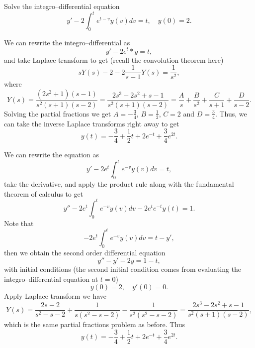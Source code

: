 \documentclass[11pt]{article}
\begin{document}
\begin{problem}
Solve the integro--differential equation
\[y'-2\int_{0}^{t}e^{t-v}y(v)dv=t,\quad y(0)=2.\]
\end{problem}
\begin{solution}
We can rewrite the integro--differential as
\[y'-2e^{t}*y=t,\]
and take Laplace transform to get (recall the convolution theorem here)
\[sY(s)-2-2\frac{1}{s-1}Y(s)=\frac{1}{s^{2}},\]
where
\[Y(s)=\frac{(2s^{2}+1)(s-1)}{s^{2}(s+1)(s-2)}=\frac{2s^{3}-2s^{2}+s-1}{s^{2}(s+1)(s-2)}=\frac{A}{s}+\frac{B}{s^{2}}+\frac{C}{s+1}+\frac{D}{s-2}.\]
Solving the partial fractions we get $A=-\frac{3}{4}$, $B=\frac{1}{2}$, $C=2$ and $D=\frac{3}{4}$.
Thus, we can take the inverse Laplace transforms right away to get
\[\boxed{y(t)=-\frac{3}{4}+\frac{1}{2}t+2e^{-t}+\frac{3}{4}e^{2t}}.\]
\end{solution}
\begin{solution}
We can rewrite the equation as
\[y'-2e^{t}\int_{0}^{t}e^{-v}y(v)dv=t,\]
take the derivative, and apply the product rule along with the fundamental theorem of calculus to get
\[y''-2e^{t}\int_{0}^{t}e^{-v}y(v)dv-2e^{t}e^{-t}y(t)=1.\]
Note that
\[-2e^{t}\int_{0}^{t}e^{-v}y(v)dv=t-y',\]
then we obtain the second order differential equation
\[y''-y'-2y=1-t,\]
with initial conditions (the second initial condition comes from evaluating the integro--differential equation at $t=0$)
\[y(0)=2,\quad y'(0)=0.\]
Apply Laplace transform we have
\[Y(s)=\frac{2s-2}{s^{2}-s-2}+\frac{1}{s(s^{2}-s-2)}-\frac{1}{s^{2}(s^{2}-s-2)}=\frac{2s^{3}-2s^{2}+s-1}{s^{2}(s+1)(s-2)},\]
which is the same partial fractions problem as before. Thus
\[\boxed{y(t)=-\frac{3}{4}+\frac{1}{2}t+2e^{-t}+\frac{3}{4}e^{2t}}.\]
\end{solution}
\end{document}
